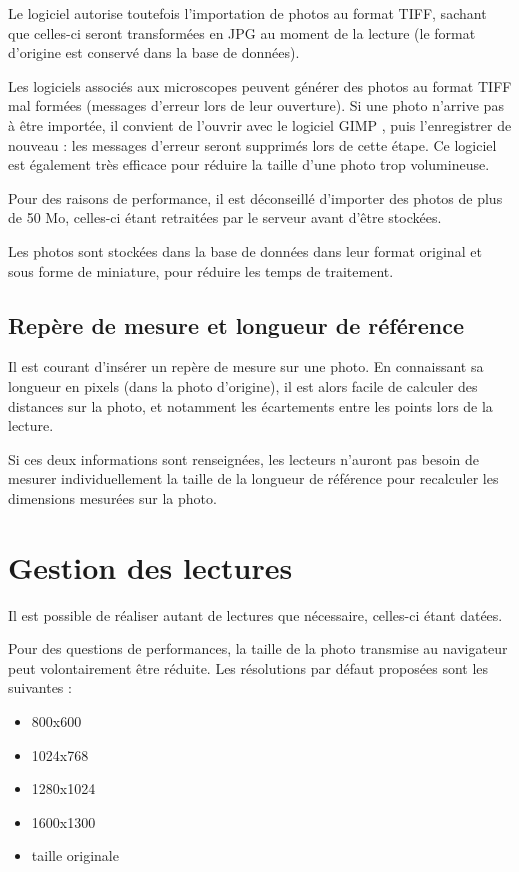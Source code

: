 Le logiciel autorise toutefois l'importation de photos au format TIFF, sachant que celles-ci seront transformées en JPG au moment de la lecture (le format d'origine est conservé dans la base de données).

Les logiciels associés aux microscopes peuvent générer des photos au format TIFF mal formées (messages d'erreur lors de leur ouverture). Si une photo n'arrive pas à être importée, il convient de l'ouvrir avec le logiciel GIMP \cite{gimp}, puis l'enregistrer de nouveau : les messages d'erreur seront supprimés lors de cette étape. Ce logiciel est également très efficace pour réduire la taille d'une photo trop volumineuse.

Pour des raisons de performance, il est déconseillé d'importer des photos de plus de 50 Mo, celles-ci étant retraitées par le serveur avant d'être stockées.

Les photos sont stockées dans la base de données dans leur format original et sous forme de miniature, pour réduire les temps de traitement.

\subsection{Repère de mesure et longueur de référence}

Il est courant d'insérer un repère de mesure sur une photo. En connaissant sa longueur en pixels (dans la photo d'origine), il est alors facile de calculer des distances sur la photo, et notamment les écartements entre les points lors de la lecture.

Si ces deux informations sont renseignées, les lecteurs n'auront pas besoin de mesurer individuellement la taille de la longueur de référence pour recalculer les dimensions mesurées sur la photo.

\section{Gestion des lectures}

Il est possible de réaliser autant de lectures que nécessaire, celles-ci étant datées.

Pour des questions de performances, la taille de la photo transmise au navigateur peut volontairement être réduite. Les résolutions par défaut proposées sont les suivantes :
\begin{itemize}
\item 800x600
\item 1024x768
\item 1280x1024
\item 1600x1300
\item taille originale
\end{itemize}

